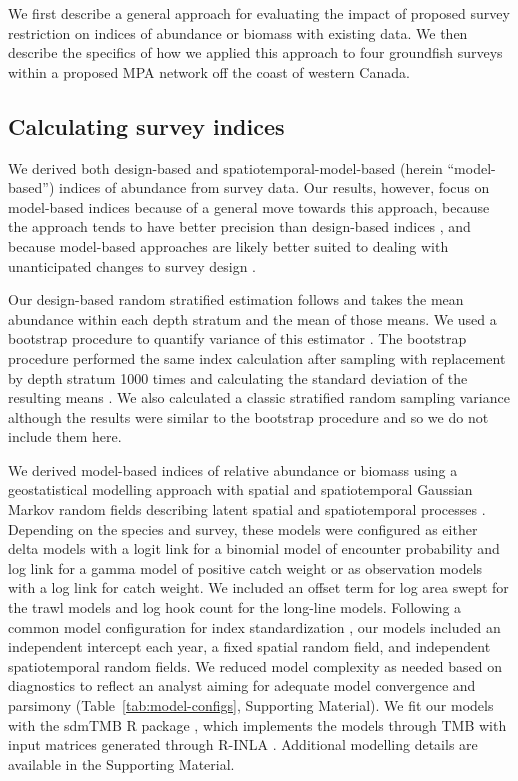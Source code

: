 \documentclass[12pt]{article}
\newcommand{\R}[1]{\label{#1}\linelabel{#1}}
\begin{document}
\begin{spacing}{1.4}
We first describe a general approach for evaluating the impact of proposed survey restriction on indices of abundance or biomass with existing data.
We then describe the specifics of how we applied this approach to four groundfish surveys within a proposed MPA network off the coast of western Canada.

\subsection*{Calculating survey indices}

We derived both design-based and spatiotemporal-model-based (herein ``model-based'') indices of abundance from survey data.
Our results, however, focus on model-based indices because of a general move towards this approach, because the approach tends to have better precision than design-based indices \citep{thorson2015a}, and because model-based approaches are likely better suited to dealing with unanticipated changes to survey design \citep{ices2023}.

Our design-based random stratified estimation follows \citet[][p.~91]{cochran1977} and takes the mean abundance within each depth stratum and the mean of those means.
We used a bootstrap procedure to quantify variance of this estimator \citep{schnute2000}.
The bootstrap procedure performed the same index calculation after sampling with replacement by depth stratum 1000 times and calculating the standard deviation of the resulting means \citep{schnute2000}.
We also calculated a classic stratified random sampling variance \citep[][p.~95]{cochran1977} although the results were similar to the bootstrap procedure and so we do not include them here.

We derived model-based indices of relative abundance or biomass using a geostatistical modelling approach with spatial and spatiotemporal Gaussian Markov random fields describing latent spatial and spatiotemporal processes \citep[e.g.,][]{thorson2015a, anderson2022}.
Depending on the species and survey, these models were configured as either delta models \citep{aitchison1955} with a logit link for a binomial model of encounter probability  and log link for a gamma model of positive catch weight \citep{schnute2003} or as \citet{tweedie1984} observation models with a log link for catch weight.
We included an offset term \citep[][p.~206]{mccullagh1989} for log area swept for the trawl models and log hook count \R{B10} for the long-line models.
Following a common model configuration for index standardization \citep[e.g.,][]{thorson2015a, thorson2019a}, our models included an independent intercept each year, a fixed spatial random field, and independent spatiotemporal random fields.
We reduced model complexity as needed based on diagnostics to reflect an analyst aiming for adequate model convergence and parsimony (Table~\ref{tab:model-configs}, Supporting Material).
We fit our models with the sdmTMB \textsf{R} package \citep{anderson2022}, which implements the models through TMB \citep{kristensen2016} with input matrices generated through \textsf{R}-INLA \citep{lindgren2015}.
Additional modelling details are available in the Supporting Material.


\end{spacing}
\end{document}
